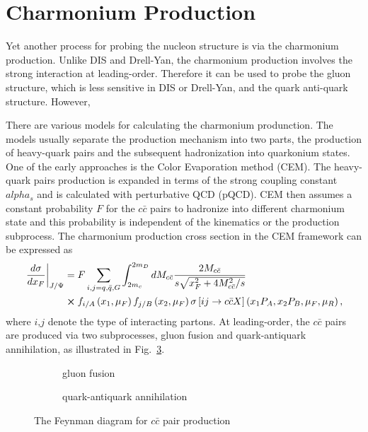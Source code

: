 \section{Charmonium Production}
\label{sec:jpsi}
Yet another process for probing the nucleon structure is via the charmonium production\cite{peng1995,chang2020}.
Unlike DIS and Drell-Yan, the charmonium production involves the strong interaction
at leading-order. Therefore it can be used to probe the gluon structure, which is 
less sensitive in DIS or Drell-Yan, and the quark anti-quark structure. However, 

There are various models for calculating the charmonium produnction. The models 
usually separate the production mechanism into two parts, the production of 
heavy-quark pairs and the subsequent hadronization into quarkonium states. One 
of the early approaches is the Color Evaporation method (CEM)\cite{einhorn1975,bodwin1995,bodwin1997}.
The heavy-quark pairs production is expanded in terms of the strong coupling 
constant $alpha_s$ and is calculated with perturbative QCD (pQCD). CEM then 
assumes a constant probability $F$ for the $c\bar{c}$ pairs to hadronize into 
different charmonium state and this probability is independent of the kinematics 
or the production subprocess. The charmonium production cross section in the CEM 
framework can be expressed as
\begin{equation}
    \begin{split}
        \left.\frac{d\sigma}{dx_F}\right|_{J/\Psi} &= F \sum_{i,j = q,\bar{q},G}\int^{2m_D}_{2m_c} dM_{c\bar{c}}  \frac{2M_{c\bar{c}}}{s\sqrt{x_F^2+4M_{c\bar{c}}^2/s}}\\
        &\cross f_{i/A}\left(x_1,\mu_F\right)f_{j/B}\left(x_2,\mu_F\right)\sigma\left[ij\rightarrow c\bar{c}X\right]\left(x_1P_A,x_2P_B,\mu_F,\mu_R \right),
    \end{split}
\end{equation}
where $i$,$j$ denote the type of interacting partons. At leading-order, the 
$c\bar{c}$ pairs are produced via two subprocesses, gluon fusion and 
quark-antiquark annihilation, as illustrated in Fig.\ \ref{fig:charmonium}.
\begin{figure}[htpb!]
    \centering
    \begin{subfigure}{0.4\linewidth}
        \begin{subfigure}{\linewidth}
        
        \end{subfigure}
        \begin{subfigure}{\linewidth}
        
        \end{subfigure}
        \caption{gluon fusion\label{subfig:gluon}}
    \end{subfigure}
    \quad
    \begin{subfigure}{0.4\linewidth}
    
    \caption{quark-antiquark annihilation\label{subfig:qqbar}}
    \end{subfigure}
    \caption{The Feynman diagram for $c\bar{c}$ pair production}
    \label{fig:charmonium}
\end{figure}
